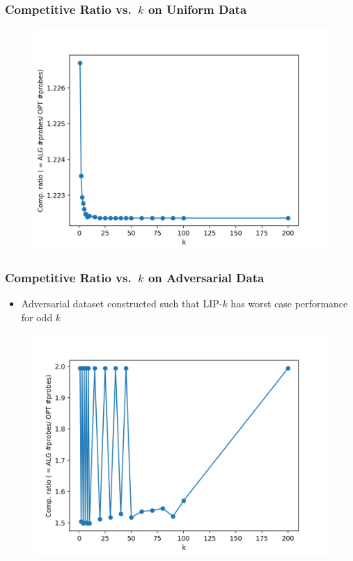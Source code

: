 \documentclass{beamer}
\begin{document}
\begin{frame}
  \frametitle{Competitive Ratio vs.\ $k$ on Uniform Data}
  \begin{figure}
    \centering
    \includegraphics[height=0.7\textheight,keepaspectratio]{cr-k-uniform}
  \end{figure}
\end{frame}



\begin{frame}
  \frametitle{Competitive Ratio vs.\ $k$ on Adversarial Data}
  \begin{itemize}
      \item Adversarial dataset constructed such that LIP-$k$ has worst case performance for odd $k$
  \end{itemize}
  \begin{figure}
    \centering
    \includegraphics[height=0.7\textheight,keepaspectratio]{cr-k-skewed}
  \end{figure}
\end{frame}
\end{document}
